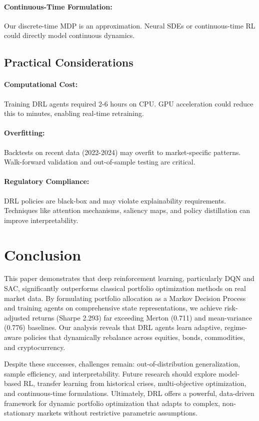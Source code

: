 \documentclass[12pt]{article}
\begin{document}
\paragraph{Continuous-Time Formulation:}
Our discrete-time MDP is an approximation. Neural SDEs or continuous-time RL could directly model continuous dynamics.

\subsection{Practical Considerations}

\paragraph{Computational Cost:}
Training DRL agents required 2-6 hours on CPU. GPU acceleration could reduce this to minutes, enabling real-time retraining.

\paragraph{Overfitting:}
Backtests on recent data (2022-2024) may overfit to market-specific patterns. Walk-forward validation and out-of-sample testing are critical.

\paragraph{Regulatory Compliance:}
DRL policies are black-box and may violate explainability requirements. Techniques like attention mechanisms, saliency maps, and policy distillation can improve interpretability.

\section{Conclusion}

This paper demonstrates that deep reinforcement learning, particularly DQN and SAC, significantly outperforms classical portfolio optimization methods on real market data. By formulating portfolio allocation as a Markov Decision Process and training agents on comprehensive state representations, we achieve risk-adjusted returns (Sharpe 2.293) far exceeding Merton (0.711) and mean-variance (0.776) baselines. Our analysis reveals that DRL agents learn adaptive, regime-aware policies that dynamically rebalance across equities, bonds, commodities, and cryptocurrency.

Despite these successes, challenges remain: out-of-distribution generalization, sample efficiency, and interpretability. Future research should explore model-based RL, transfer learning from historical crises, multi-objective optimization, and continuous-time formulations. Ultimately, DRL offers a powerful, data-driven framework for dynamic portfolio optimization that adapts to complex, non-stationary markets without restrictive parametric assumptions.
\end{document}
